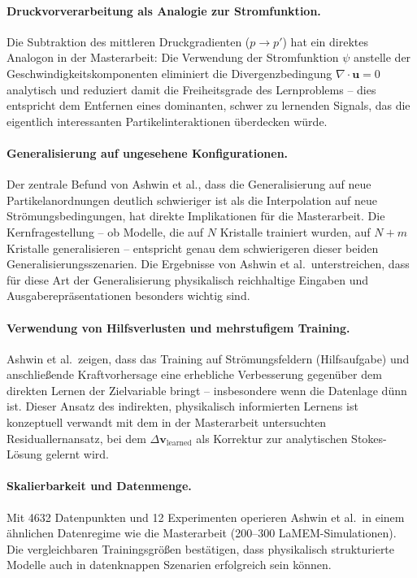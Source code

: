 \documentclass[a4paper,12pt]{article}
\begin{document}
\paragraph{Druckvorverarbeitung als Analogie zur Strom\-funktion.}
Die Subtraktion des mittleren Druckgradienten ($p \to p'$) hat ein direktes
Analogon in der Masterarbeit: Die Verwendung der Stromfunktion $\psi$ anstelle
der Geschwindigkeitskomponenten eliminiert die Divergenzbedingung
$\nabla \cdot \mathbf{u} = 0$ analytisch und reduziert damit die Freiheitsgrade
des Lernproblems -- dies entspricht dem Entfernen eines dominanten, schwer zu
lernenden Signals, das die eigentlich interessanten Partikelinteraktionen
überdecken würde.

\paragraph{Generalisierung auf ungesehene Konfigurationen.}
Der zentrale Befund von Ashwin et al., dass die Generalisierung auf neue
Partikelanordnungen deutlich schwieriger ist als die Interpolation auf neue
Strömungsbedingungen, hat direkte Implikationen für die Masterarbeit. Die
Kernfragestellung -- ob Modelle, die auf $N$ Kristalle trainiert wurden, auf
$N + m$ Kristalle generalisieren -- entspricht genau dem schwierigeren dieser
beiden Generalisierungsszenarien. Die Ergebnisse von Ashwin et al.\
unterstreichen, dass für diese Art der Generalisierung physikalisch reichhaltige
Eingaben und Ausgaberepräsentationen besonders wichtig sind.

\paragraph{Verwendung von Hilfsverlusten und mehrstufigem Training.}
Ashwin et al.\ zeigen, dass das Training auf Strömungsfeldern (Hilfsaufgabe)
und anschließende Kraft\-vorhersage eine erhebliche Verbesserung gegenüber dem
direkten Lernen der Zielvariable bringt -- insbesondere wenn die Datenlage dünn
ist. Dieser Ansatz des indirekten, physikalisch informierten Lernens ist
konzeptuell verwandt mit dem in der Masterarbeit untersuchten Residuallern\-ansatz,
bei dem $\Delta\mathbf{v}_\text{learned}$ als Korrektur zur analytischen
Stokes-Lösung gelernt wird.

\paragraph{Skalierbarkeit und Datenmenge.}
Mit 4632 Datenpunkten und 12 Experimenten operieren Ashwin et al.\ in einem
ähnlichen Datenregime wie die Masterarbeit (200--300 LaMEM-Simulationen).
Die vergleichbaren Trainingsgrößen bestätigen, dass physikalisch strukturierte
Modelle auch in datenknappen Szenarien erfolgreich sein können.
\end{document}
